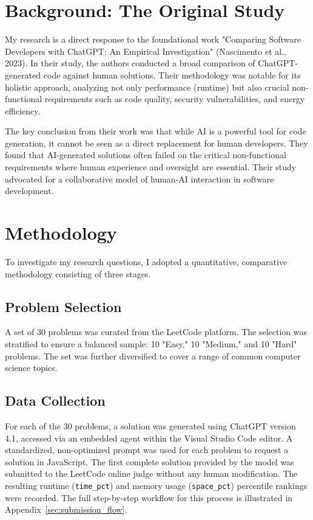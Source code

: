 \documentclass[12pt, a4paper]{article}
\begin{document}
\section{Background: The Original Study}

My research is a direct response to the foundational work "Comparing Software Developers with ChatGPT: An Empirical Investigation" (Nascimento et al., 2023). In their study, the authors conducted a broad comparison of ChatGPT-generated code against human solutions. Their methodology was notable for its holistic approach, analyzing not only performance (runtime) but also crucial non-functional requirements such as code quality, security vulnerabilities, and energy efficiency.

The key conclusion from their work was that while AI is a powerful tool for code generation, it cannot be seen as a direct replacement for human developers. They found that AI-generated solutions often failed on the critical non-functional requirements where human experience and oversight are essential. Their study advocated for a collaborative model of human-AI interaction in software development.

\section{Methodology}

To investigate my research questions, I adopted a quantitative, comparative methodology consisting of three stages.

\subsection{Problem Selection}
A set of 30 problems was curated from the LeetCode platform. The selection was stratified to ensure a balanced sample: 10 "Easy," 10 "Medium," and 10 "Hard" problems. The set was further diversified to cover a range of common computer science topics.

\subsection{Data Collection}
For each of the 30 problems, a solution was generated using ChatGPT version 4.1, accessed via an embedded agent within the Visual Studio Code editor. A standardized, non-optimized prompt was used for each problem to request a solution in JavaScript. The first complete solution provided by the model was submitted to the LeetCode online judge without any human modification. The resulting runtime (\texttt{time\_pct}) and memory usage (\texttt{space\_pct}) percentile rankings were recorded. The full step-by-step workflow for this process is illustrated in Appendix~\ref{sec:submission_flow}.
\end{document}
